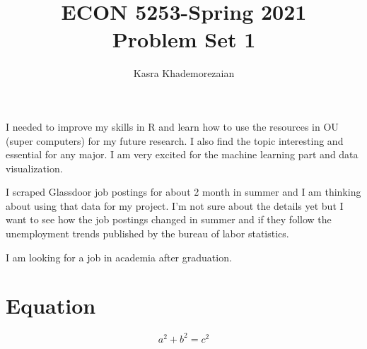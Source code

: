 \documentclass[12pt]{article}
\title{ECON 5253-Spring 2021\\
Problem Set 1}
\author{Kasra Khademorezaian}
\begin{document}
\maketitle

I needed to improve my skills in R and learn how to use the resources in OU (super computers) for my future research. I also find the topic interesting and essential for any major. I am very excited for the machine learning part and data visualization.
    
I scraped Glassdoor job postings for about 2 month in summer and I am thinking about using that data for my project. I'm not sure about the details yet but I want to see how the job postings changed in summer and if they follow the unemployment trends published by the bureau of labor statistics.
    
I am looking for a job in academia after graduation.
\section*{Equation}
$$a^2+b^2=c^2$$
    
\end{document}
